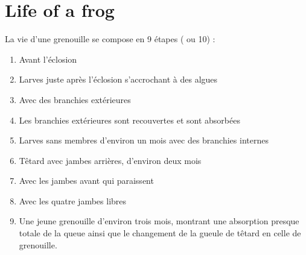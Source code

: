 \section{Life of a frog}
La vie d'une grenouille se compose en 9 étapes ( ou 10) :
	\begin{enumerate}
	\item Avant l'éclosion
	\item Larves juste après l'éclosion s'accrochant à des algues
	\item Avec des branchies extérieures
	\item Les branchies extérieures sont recouvertes et sont absorbées
	\item Larves sans membres d'environ un mois avec des branchies internes
	\item Têtard avec jambes arrières, d'environ deux mois
	\item Avec les jambes avant qui paraissent
	\item Avec les quatre jambes libres
	\item Une jeune grenouille d'environ trois mois, montrant une absorption presque totale de la queue ainsi que le changement de la gueule de têtard en celle de grenouille.
	\end{enumerate}
	
